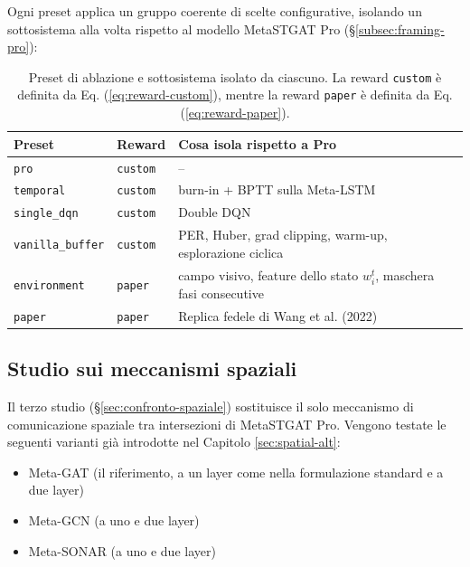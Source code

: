 Ogni preset applica un gruppo coerente di scelte configurative,
isolando un sottosistema alla volta rispetto al modello MetaSTGAT Pro (§\ref{subsec:framing-pro}):

\begin{table}[htbp]
  \centering
  \small
  \begin{tabular}{@{}llp{8.5cm}@{}}
    \toprule
    Preset                   & Reward          & Cosa isola rispetto a Pro                                             \\
    \midrule
    \texttt{pro}             & \texttt{custom} & --                                                                    \\
    \texttt{temporal}        & \texttt{custom} & burn-in + BPTT sulla Meta-LSTM                                        \\
    \texttt{single\_dqn}     & \texttt{custom} & Double DQN                                                            \\
    \texttt{vanilla\_buffer} & \texttt{custom} & PER, Huber, grad clipping, warm-up, esplorazione ciclica              \\
    \texttt{environment}     & \texttt{paper}  & campo visivo, feature dello stato $w_i^t$, maschera fasi consecutive  \\
    \texttt{paper}           & \texttt{paper}  & Replica fedele di Wang et al. (2022)                                  \\
    \bottomrule
  \end{tabular}
  \caption{Preset di ablazione e sottosistema isolato da ciascuno. La reward \texttt{custom} è definita da Eq. (\ref{eq:reward-custom}), mentre la reward \texttt{paper} è definita da Eq. (\ref{eq:reward-paper}).}
  \label{tab:ablation-preset}
\end{table}

\subsection{Studio sui meccanismi spaziali}

Il terzo studio (§\ref{sec:confronto-spaziale}) sostituisce il solo
meccanismo di comunicazione spaziale tra intersezioni di MetaSTGAT Pro.
Vengono testate le seguenti varianti già introdotte nel Capitolo \ref{sec:spatial-alt}:
\begin{itemize}
  \item Meta-GAT (il riferimento, a un layer come nella formulazione standard e a due layer)
  \item Meta-GCN (a uno e due layer)
  \item Meta-SONAR (a uno e due layer)
\end{itemize}

